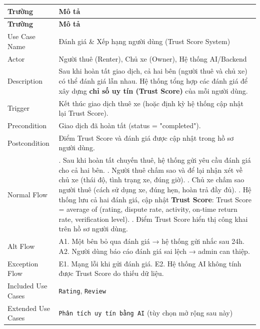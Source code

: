 \begin{longtable}{|>{\raggedright\arraybackslash}p{4cm}|>{\raggedright\arraybackslash}p{11cm}|}
\hline
\textbf{Trường} & \textbf{Mô tả} \\
\hline
\endfirsthead

\hline
\textbf{Trường} & \textbf{Mô tả} \\
\hline
\endhead

\hline
\endfoot

Use Case Name & Đánh giá \& Xếp hạng người dùng (Trust Score System) \\
\hline
Actor & Người thuê (Renter), Chủ xe (Owner), Hệ thống AI/Backend \\
\hline
Description & Sau khi hoàn tất giao dịch, cả hai bên (người thuê và chủ xe) có thể đánh giá lẫn nhau. Hệ thống tổng hợp các đánh giá để xây dựng \textbf{chỉ số uy tín (Trust Score)} của mỗi người dùng. \\
\hline
Trigger & Kết thúc giao dịch thuê xe (hoặc định kỳ hệ thống cập nhật lại Trust Score). \\
\hline
Precondition & Giao dịch đã hoàn tất (status = "completed"). \\
\hline
Postcondition & Điểm Trust Score và đánh giá được cập nhật trong hồ sơ người dùng. \\
\hline
Normal Flow & 1. Sau khi hoàn tất chuyến thuê, hệ thống gửi yêu cầu đánh giá cho cả hai bên. \newline 2. Người thuê chấm sao và để lại nhận xét về chủ xe (thái độ, tình trạng xe, đúng giờ). \newline 3. Chủ xe chấm sao người thuê (cách sử dụng xe, đúng hẹn, hoàn trả đầy đủ). \newline 4. Hệ thống lưu cả hai đánh giá, cập nhật \textbf{Trust Score}: \newline Trust Score = average of (rating, dispute rate, activity, on-time return rate, verification level). \newline 5. Điểm Trust Score hiển thị công khai trên hồ sơ người dùng. \\
\hline
Alt Flow & A1. Một bên bỏ qua đánh giá → hệ thống gửi nhắc sau 24h. \newline A2. Người dùng báo cáo đánh giá sai lệch → admin can thiệp. \\
\hline
Exception Flow & E1. Mạng lỗi khi gửi đánh giá. \newline E2. Hệ thống AI không tính được Trust Score do thiếu dữ liệu. \\
\hline
Included Use Cases & \texttt{Rating}, \texttt{Review} \\
\hline
Extended Use Cases & \texttt{Phân tích uy tín bằng AI} (tùy chọn mở rộng sau này) \\
\hline
\end{longtable}

